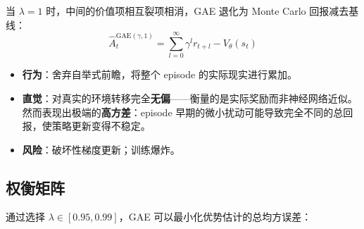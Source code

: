 \begin{keybox}[低偏差/高方差的限制（$\lambda = 1$）]
当 $\lambda = 1$ 时，中间的价值项相互裂项相消，GAE 退化为 Monte Carlo 回报减去基线：
\begin{equation}
\hat{A}_t^{\text{GAE}(\gamma, 1)} = \sum_{l=0}^{\infty} \gamma^l r_{t+l} - V_\theta(s_t)
\end{equation}

\begin{itemize}
  \item \textbf{行为}：舍弃自举式前瞻，将整个 episode 的实际现实进行累加。
  \item \textbf{直觉}：对真实的环境转移完全\textbf{无偏}——衡量的是实际奖励而非神经网络近似。然而表现出极端的\textbf{高方差}：episode 早期的微小扰动可能导致完全不同的总回报，使策略更新变得不稳定。
  \item \textbf{风险}：破坏性梯度更新；训练爆炸。
\end{itemize}
\end{keybox}

\subsection{权衡矩阵}
\label{the-trade-off-matrix}

通过选择 $\lambda \in [0.95, 0.99]$，GAE 可以最小化优势估计的总均方误差：


